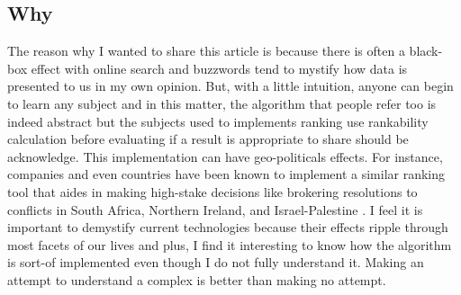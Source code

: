 \documentclass[a4paper,man,biblatex]{apa6}
\begin{document}
\subsection{Why} The reason why I wanted to share this article is because there is often a black-box effect with online search and buzzwords tend to mystify how data is presented to us in my own opinion. But, with a little intuition, anyone can begin to learn any subject and in this matter, the algorithm that people refer too is indeed abstract but the subjects used to implements ranking use rankability calculation before evaluating if a result is appropriate to share should be acknowledge. This implementation can have geo-politicals effects. For instance, companies and even countries have been known to implement a similar ranking tool that aides in making high-stake decisions like brokering resolutions to conflicts in South Africa, Northern Ireland, and Israel-Palestine \autocite{rankability}. I feel it is important to demystify current technologies because their effects ripple through most facets of our lives and plus, I find it interesting to know how the algorithm is sort-of implemented even though I do not fully understand it. Making an attempt to understand a complex is better than making no attempt.

\printbibliography
\end{document}
